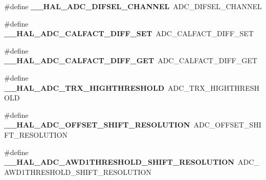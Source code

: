 \begin{DoxyCompactItemize}
\item 
\mbox{\label{group___h_a_l___a_d_c___aliased___macros_ga697c5bcf01d90462bf0c65c1434204a2}} 
\#define {\bfseries \+\_\+\+\_\+\+H\+A\+L\+\_\+\+A\+D\+C\+\_\+\+D\+I\+F\+S\+E\+L\+\_\+\+C\+H\+A\+N\+N\+EL}~A\+D\+C\+\_\+\+D\+I\+F\+S\+E\+L\+\_\+\+C\+H\+A\+N\+N\+EL
\item 
\mbox{\label{group___h_a_l___a_d_c___aliased___macros_ga0d6a948351847da8e821fd673cd5395c}} 
\#define {\bfseries \+\_\+\+\_\+\+H\+A\+L\+\_\+\+A\+D\+C\+\_\+\+C\+A\+L\+F\+A\+C\+T\+\_\+\+D\+I\+F\+F\+\_\+\+S\+ET}~A\+D\+C\+\_\+\+C\+A\+L\+F\+A\+C\+T\+\_\+\+D\+I\+F\+F\+\_\+\+S\+ET
\item 
\mbox{\label{group___h_a_l___a_d_c___aliased___macros_ga04d8142122bd9275a1219043edc63d98}} 
\#define {\bfseries \+\_\+\+\_\+\+H\+A\+L\+\_\+\+A\+D\+C\+\_\+\+C\+A\+L\+F\+A\+C\+T\+\_\+\+D\+I\+F\+F\+\_\+\+G\+ET}~A\+D\+C\+\_\+\+C\+A\+L\+F\+A\+C\+T\+\_\+\+D\+I\+F\+F\+\_\+\+G\+ET
\item 
\mbox{\label{group___h_a_l___a_d_c___aliased___macros_ga33afa59f288d4671512aed3dfb8f70b7}} 
\#define {\bfseries \+\_\+\+\_\+\+H\+A\+L\+\_\+\+A\+D\+C\+\_\+\+T\+R\+X\+\_\+\+H\+I\+G\+H\+T\+H\+R\+E\+S\+H\+O\+LD}~A\+D\+C\+\_\+\+T\+R\+X\+\_\+\+H\+I\+G\+H\+T\+H\+R\+E\+S\+H\+O\+LD
\item 
\mbox{\label{group___h_a_l___a_d_c___aliased___macros_ga0f83fc077ad488745139c8e24641d437}} 
\#define {\bfseries \+\_\+\+\_\+\+H\+A\+L\+\_\+\+A\+D\+C\+\_\+\+O\+F\+F\+S\+E\+T\+\_\+\+S\+H\+I\+F\+T\+\_\+\+R\+E\+S\+O\+L\+U\+T\+I\+ON}~A\+D\+C\+\_\+\+O\+F\+F\+S\+E\+T\+\_\+\+S\+H\+I\+F\+T\+\_\+\+R\+E\+S\+O\+L\+U\+T\+I\+ON
\item 
\mbox{\label{group___h_a_l___a_d_c___aliased___macros_ga616002cefa3a1ba7af4fa612afd02561}} 
\#define {\bfseries \+\_\+\+\_\+\+H\+A\+L\+\_\+\+A\+D\+C\+\_\+\+A\+W\+D1\+T\+H\+R\+E\+S\+H\+O\+L\+D\+\_\+\+S\+H\+I\+F\+T\+\_\+\+R\+E\+S\+O\+L\+U\+T\+I\+ON}~A\+D\+C\+\_\+\+A\+W\+D1\+T\+H\+R\+E\+S\+H\+O\+L\+D\+\_\+\+S\+H\+I\+F\+T\+\_\+\+R\+E\+S\+O\+L\+U\+T\+I\+ON
\item 

\end{DoxyCompactItemize}
